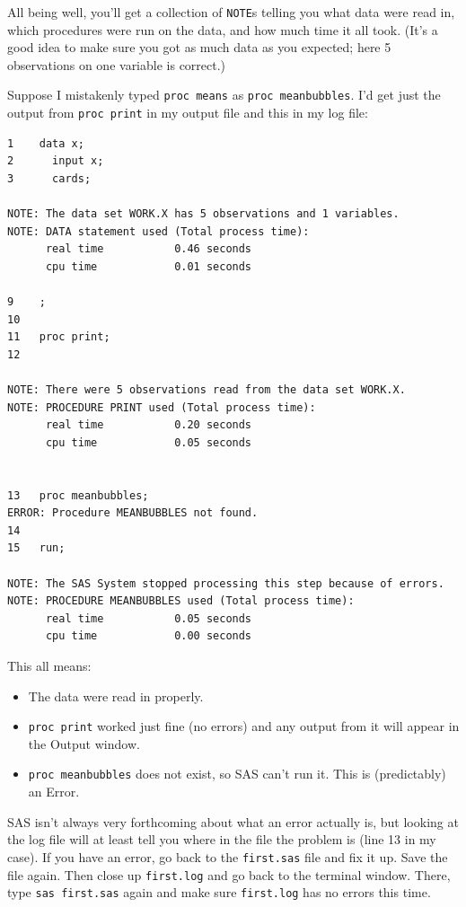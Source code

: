 \documentclass[11pt]{article}
\begin{document}
All being well, you'll get a collection of \texttt{NOTE}s telling you
what data were read in, which procedures were run on the data, and how
much time it all took. (It's a good idea to make sure you got as much
data as you expected; here 5 observations on one variable is correct.)

Suppose I mistakenly typed \verb-proc means- as
\verb-proc meanbubbles-. I'd get just the output
from \verb-proc print- in my output file and this in my log file:

\filbreak
\begin{verbatim}
1    data x;
2      input x;
3      cards;

NOTE: The data set WORK.X has 5 observations and 1 variables.
NOTE: DATA statement used (Total process time):
      real time           0.46 seconds
      cpu time            0.01 seconds

9    ;
10
11   proc print;
12

NOTE: There were 5 observations read from the data set WORK.X.
NOTE: PROCEDURE PRINT used (Total process time):
      real time           0.20 seconds
      cpu time            0.05 seconds


13   proc meanbubbles;
ERROR: Procedure MEANBUBBLES not found.
14
15   run;

NOTE: The SAS System stopped processing this step because of errors.
NOTE: PROCEDURE MEANBUBBLES used (Total process time):
      real time           0.05 seconds
      cpu time            0.00 seconds

\end{verbatim}
\filbreak

This all means:

\begin{itemize}
\item The data were read in properly.
\item \verb-proc print- worked just fine (no errors) and any output
  from it will appear in the Output window.
\item \verb-proc meanbubbles- does not exist, so SAS can't run
  it. This is (predictably) an Error.
\end{itemize}

SAS isn't always very forthcoming about what an error actually is, but
looking at the log file will at least tell you where in the file the
problem is (line 13 in my case). If you have an error, go back to the
\texttt{first.sas} file and fix it up. Save the file again. Then close
up \texttt{first.log} and go back to the terminal window. There, type
\texttt{sas first.sas} again and make sure \texttt{first.log} has no
errors this time. 
\end{document}
